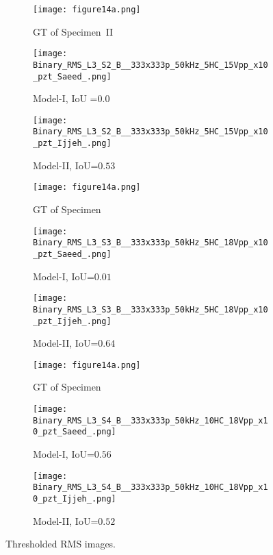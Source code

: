 \begin{sloppypar}
	\begin{figure} [!ht]
		\centering
		\begin{subfigure}[b]{0.32\textwidth}
			\centering
			\texttt{[image: figure14a.png]}
			\caption{GT of Specimen~II}
			\label{fig:gt_specimen_2}
		\end{subfigure}
		\hfill
		\begin{subfigure}[b]{.32\textwidth}
			\centering
			\texttt{[image: Binary\_RMS\_L3\_S2\_B\_\_333x333p\_50kHz\_5HC\_15Vpp\_x10\_pzt\_Saeed\_.png]}
			\caption{Model-I, IoU =$0.0$}
			\label{fig:RMS_threshold_L3_S2_B_saeed}
		\end{subfigure}
		\hfill
		\begin{subfigure}[b]{.32\textwidth}
			\centering
			\texttt{[image: Binary\_RMS\_L3\_S2\_B\_\_333x333p\_50kHz\_5HC\_15Vpp\_x10\_pzt\_Ijjeh\_.png]}
			\caption{Model-II, IoU=$0.53$} 
			\label{fig:RMS_threshold_L3_S2_B_ijjeh}
		\end{subfigure}
		\hfill
		\begin{subfigure}[b]{0.32\textwidth}
			\centering
			\texttt{[image: figure14a.png]}
			\caption{GT of Specimen~}
			\label{fig:gt_specimen_3}
		\end{subfigure}
		\hfill
		\begin{subfigure}[b]{.32\textwidth}
			\centering
			\texttt{[image: Binary\_RMS\_L3\_S3\_B\_\_333x333p\_50kHz\_5HC\_18Vpp\_x10\_pzt\_Saeed\_.png]}
			\caption{Model-I, IoU=$0.01$}
			\label{fig:RMS_threshold_L3_S3_B_saeed}
		\end{subfigure}
		\hfill
		\begin{subfigure}[b]{.32\textwidth}
			\centering
			\texttt{[image: Binary\_RMS\_L3\_S3\_B\_\_333x333p\_50kHz\_5HC\_18Vpp\_x10\_pzt\_Ijjeh\_.png]}
			\caption{Model-II, IoU=$0.64$} 
			\label{fig:RMS_threshold_L3_S3_B_ijjeh}
		\end{subfigure}
		\hfill
		\begin{subfigure}[b]{0.32\textwidth}
			\centering
			\texttt{[image: figure14a.png]}
			\caption{GT of Specimen~}
			\label{fig:gt_specimen_4}
		\end{subfigure}
		\hfill
		\begin{subfigure}[b]{.32\textwidth}
			\centering
			\texttt{[image: Binary\_RMS\_L3\_S4\_B\_\_333x333p\_50kHz\_10HC\_18Vpp\_x10\_pzt\_Saeed\_.png]}
			\caption{Model-I, IoU=$0.56$}
			\label{fig:RMS_threshold_L3_S4_B_saeed}
		\end{subfigure}
		\hfill
		\begin{subfigure}[b]{.32\textwidth}
			\centering
			\texttt{[image: Binary\_RMS\_L3\_S4\_B\_\_333x333p\_50kHz\_10HC\_18Vpp\_x10\_pzt\_Ijjeh\_.png]}
			\caption{Model-II, IoU=$0.52$} 
			\label{fig:RMS_threshold_L3_S4_B_ijjeh}
		\end{subfigure}
		\caption{Thresholded RMS images.}
		\label{fig:RMS_threshold_L3_S4_B__images}
	\end{figure} 
	

\end{sloppypar}
